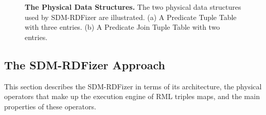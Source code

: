 \begin{figure}[!th]
 \centering

    \caption[Physical Data Structures for KGC]{{\bf The Physical Data Structures.} The two physical data structures used by SDM-RDFizer are illustrated. (a) A Predicate Tuple Table with three entries. (b) A Predicate Join Tuple Table with two entries.}
    \label{fig:hash_table}
\end{figure}


\subsection{The SDM-RDFizer Approach}

This section describes the SDM-RDFizer in terms of its architecture, the physical operators that make up the execution engine of RML triples maps, and the main properties of these operators.  


